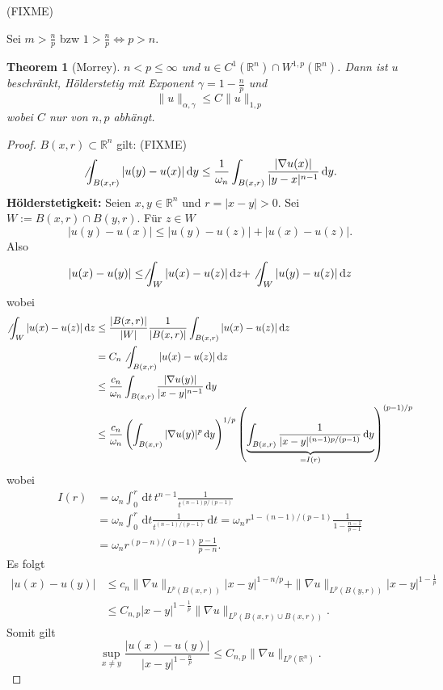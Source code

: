 \documentclass[
paper=a4,
bibtotocnumbered,
liststotocnumbered,
tablecaptionabove,
pointlessnumbers,
twoside,
openright,
10pt
]
{report}
\newtheorem{thm}{Theorem}[chapter]
\theoremstyle{definition}
\numberwithin{equation}{chapter}
\begin{document}
(FIXME)

Sei $m>\frac{n}{p}$ bzw $1 > \frac{n}{p}\iff p>n$.
\begin{thm}[Morrey]\label{3.4}
	$n<p\le \infty$ und $u\in C^1(\mathbb R^n)\cap W^{1,p}(\mathbb R^n)$. Dann ist $u$ beschränkt, Hölderstetig mit Exponent $\gamma =1 - \frac{n}{p}$ und
	\begin{equation}
		\| u\|_{\alpha, \gamma} \le C \| u \|_{1,p}
	\end{equation}
	wobei $C$ nur von $n,p$ abhängt.
\end{thm}
\begin{proof}
	$B(x,r) \subset \mathbb R^n$ gilt: (FIXME)
	\begin{equation}
		\not\int_{B(x,r)} | u(y)- u(x) |\, \mathrm dy \le \frac{1}{\omega_n} \int_{B(x,r)} \frac{|\nabla u(x)|}{|y-x|^{n-1}}\, \mathrm dy.
	\end{equation}
	\textbf{Hölderstetigkeit:} Seien $x,y\in \mathbb R^n$ und $r=|x-y|>0$. Sei $W:= B(x,r) \cap B(y,r)$. Für $z\in W$
	\begin{equation}
	|u(y)-u(x)|\le |u(y)-u(z)|+ |u(x)-u(z)|.
	\end{equation}
	Also
	\begin{equation}
		|u(x)-u(y)| \le \not \int_W | u(x) - u(z)| \, \mathrm dz + \not \int_W |u(y)-u(z)|\, \mathrm dz
	\end{equation}
	wobei 
	\begin{align*}
	\not \int_W |u(x)-u(z)|\, \mathrm dz &\le \frac{|B(x,r)|}{|W|} \frac{1}{|B(x,r)|} \int_{B(x,r)} |u(x)- u(z)|\, \mathrm dz\\
	&= C_n \not \int_{B(x,r)} |u(x)-u(z)|\, \mathrm dz \\
	&\le \frac{c_n}{\omega_n} \int_{B(x,r)} \frac{|\nabla u(y)|}{|x-y|^{n-1}} \, \mathrm dy \\
	&\le \frac{c_n}{\omega_n} \left ( \int_{B(x,r)} |\nabla u(y)|^p \, \mathrm dy \right )^{1/p} \left ( \underbrace{\int_{B(x,r)} \frac{1}{|x-y|^{(n-1) p/(p-1)}}\, \mathrm dy}_{=I(r)} \right )^{(p-1)/p}\\
\end{align*}
wobei
\begin{align*}
	I(r) &= \omega_n \int_0^r \, \mathrm dt \, t^{n-1} \frac{1}{t^{(n-1) p/(p-1)}} \\
	&= \omega_n \int_0^r \, \mathrm dt \frac{1}{t^{(n-1)/(p-1)}}\, \mathrm dt = \omega_n r^{1-(n-1)/(p-1)} \frac{1}{1-\frac{n-1}{p-1}} \\
	&= \omega_n r^{(p-n)/(p-1)}\frac{p-1}{p-n}.
\end{align*}
Es folgt
\begin{align*}
	|u(x)-u(y)| &\le c_n \| \nabla u\|_{L^p(B(x,r))} |x-y|^{1-n/p} +\| \nabla u\|_{L^p(B(y,r))} |x-y|^{1-\frac{1}{p}}\\
&\le C_{n,p} |x-y|^{1-\frac{1}{p}}\|\nabla u \|_{L^p(B(x,r)\cup B(x,r))}.
\end{align*}
Somit gilt
\begin{equation}
	\sup_{x\ne y} \frac{|u(x)-u(y)|}{{|x-y|}^{1-\frac{n}{p}}} \le C_{n,p} \| \nabla u\|_{L^p(\mathbb R^n)}.
\end{equation}

\end{proof}
\end{document}
